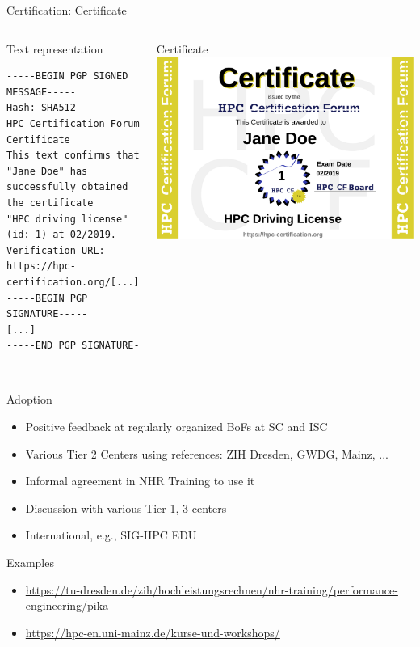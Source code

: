 \documentclass[compress,aspectratio=169]{beamer}
\begin{document}
\begin{frame}[fragile]{Certification: Certificate}
\begin{columns}
	\begin{block}{Text representation}

		\scriptsize
		\begin{verbatim}
-----BEGIN PGP SIGNED MESSAGE-----
Hash: SHA512
HPC Certification Forum Certificate
This text confirms that "Jane Doe" has
successfully obtained the certificate
"HPC driving license" (id: 1) at 02/2019.
Verification URL: https://hpc-certification.org/[...]
-----BEGIN PGP SIGNATURE-----
[...]
-----END PGP SIGNATURE-----
		\end{verbatim}
	\end{block}

	\begin{block}{Certificate}
		\medskip
		\includegraphics[width=\textwidth]{jane-doe}
	\end{block}
\end{columns}
\end{frame}

\begin{frame}{Adoption}
\begin{itemize}
  \item Positive feedback at regularly organized BoFs at SC and ISC 
  \item Various Tier 2 Centers using references: ZIH Dresden, GWDG, Mainz, ...
  \item Informal agreement in NHR Training to use it
  \item Discussion with various Tier 1, 3 centers
  \item International, e.g., SIG-HPC EDU
\end{itemize}

\begin{block}{Examples}
\begin{itemize}
  \item \url{https://tu-dresden.de/zih/hochleistungsrechnen/nhr-training/performance-engineering/pika}
  \item \url{https://hpc-en.uni-mainz.de/kurse-und-workshops/}
\end{itemize}
\end{block}
\end{frame}
\end{document}
